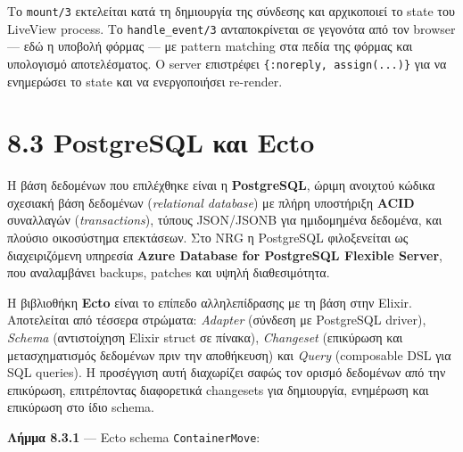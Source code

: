 \begin{Shaded}
\begin{Highlighting}[]
\OperatorTok{=}\FunctionTok{(}\FunctionTok{)}

  \FunctionTok{\{}\FunctionTok{(}\FunctionTok{)\}}
\end{Highlighting}
\end{Shaded}

Το \texttt{mount/3} εκτελείται κατά τη δημιουργία της σύνδεσης και
αρχικοποιεί το state του LiveView process. Το \texttt{handle\_event/3}
ανταποκρίνεται σε γεγονότα από τον browser --- εδώ η υποβολή φόρμας ---
με pattern matching στα πεδία της φόρμας και υπολογισμό αποτελέσματος. Ο
server επιστρέφει \texttt{\{:noreply,\ assign(...)\}} για να ενημερώσει
το state και να ενεργοποιήσει re-render.

\section{8.3 PostgreSQL και Ecto}\label{postgresql-ux3baux3b1ux3b9-ecto}

Η βάση δεδομένων που επιλέχθηκε είναι η \textbf{PostgreSQL}, ώριμη
ανοιχτού κώδικα σχεσιακή βάση δεδομένων (\emph{relational database}) με
πλήρη υποστήριξη \textbf{ACID} συναλλαγών (\emph{transactions}), τύπους
JSON/JSONB για ημιδομημένα δεδομένα, και πλούσιο οικοσύστημα επεκτάσεων.
Στο NRG η PostgreSQL φιλοξενείται ως διαχειριζόμενη υπηρεσία
\textbf{Azure Database for PostgreSQL Flexible Server}, που αναλαμβάνει
backups, patches και υψηλή διαθεσιμότητα.

Η βιβλιοθήκη \textbf{Ecto} είναι το επίπεδο αλληλεπίδρασης με τη βάση
στην Elixir. Αποτελείται από τέσσερα στρώματα: \emph{Adapter} (σύνδεση
με PostgreSQL driver), \emph{Schema} (αντιστοίχηση Elixir struct σε
πίνακα), \emph{Changeset} (επικύρωση και μετασχηματισμός δεδομένων πριν
την αποθήκευση) και \emph{Query} (composable DSL για SQL queries). Η
προσέγγιση αυτή διαχωρίζει σαφώς τον ορισμό δεδομένων από την επικύρωση,
επιτρέποντας διαφορετικά changesets για δημιουργία, ενημέρωση και
επικύρωση στο ίδιο schema.

\textbf{Λήμμα 8.3.1} --- Ecto schema \texttt{ContainerMove}:

